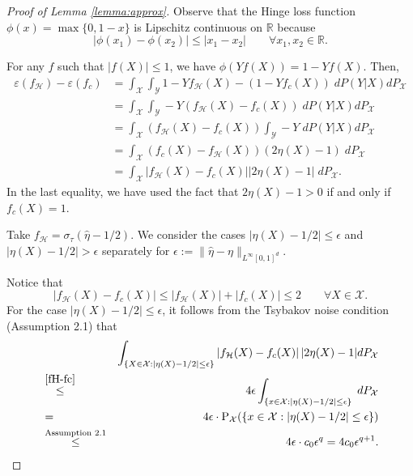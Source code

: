 \documentclass{article}
\def\RR{\mathbb R}
\begin{document}
\begin{proof}[Proof of Lemma \ref{lemma:approx}]
    Observe that the Hinge loss function $\phi(x) = \max \{0, 1-x\}$ is Lipschitz continuous on $\RR$ because 
\begin{equation} \label{Lip}
   |\phi(x_1)-\phi(x_2)| \leq |x_1-x_2| \qquad \forall x_1, x_2 \in \RR. 
\end{equation}

For any $f$ such that $|f(X)|\leq 1$, we have $\phi(Yf(X)) = 1-Yf(X)$.
Then,
\begin{align*}
  \varepsilon(f_\mathcal{H})- \varepsilon(f_c)  
  &= \int_\mathcal{X} \int_\mathcal{Y}   1-Yf_\mathcal{H}(X) - (1 - Yf_c(X)) \; dP(Y|X) d P_\mathcal{X}\\ 
  &= \int_\mathcal{X} \int_\mathcal{Y}  -Y(f_\mathcal{H}(X) - f_c(X)) \; dP(Y|X) d P_\mathcal{X}\\ 
  &=  \int_\mathcal{X}(f_\mathcal{H}(X) - f_c(X)) \int_\mathcal{Y}  -Y \; dP(Y|X)  d P_\mathcal{X}\\
  &=\int_\mathcal{X}(f_c(X)-f_\mathcal{H}(X) ) (2\eta(X)-1)\; d P_\mathcal{X}\\
  &= \int_\mathcal{X}  \left| f_\mathcal{H}(X) - f_c(X)\right|  |2\eta(X)-1|\;d P_\mathcal{X}.
\end{align*}
In the last equality, we have used the fact that $2\eta(X)-1>0$ if and only if $f_c(X)=1$. 

Take $f_\mathcal{H} = \sigma_\tau(\widehat{\eta}-1/2)$. We consider the cases $|\eta(X)-1/2| \leq \epsilon$ and $|\eta(X)-1/2| > \epsilon$ separately for $\epsilon :=\|\widehat{\eta}-\eta\|_{L^\infty[0,1]^d}$.

Notice that \begin{equation}\label{fH-fc}
    \left| f_\mathcal{H}(X) - f_c(X)\right| \leq |f_\mathcal{H}(X)|+ |f_c(X)| \leq 2 \qquad \forall X\in \mathcal{X}. 
\end{equation}
For the case $|\eta(X)-1/2| \leq \epsilon$, it follows from the Tsybakov noise condition (Assumption 2.1) that
\begin{eqnarray*}
 && \int_{\{X\in  \mathcal{X}:|\eta(X)-1/2| \leq \epsilon\} } \left| f_\mathcal{H}(X) - f_c(X)\right| |2\eta(X)-1| d P_\mathcal{X} \\
 &\stackrel{\eqref{fH-fc}}{\leq}& 4\epsilon \int_{\{x\in  \mathcal{X}: |\eta(X)-1/2| \leq \epsilon\} } \; d P_\mathcal{X}  \\
  &=&4\epsilon \cdot \mathrm{P}_{\mathcal{X}}(\{x\in  \mathcal{X} :|\eta(X)-1/2| \leq \epsilon\})\\
 &\stackrel{\text{Assumption 2.1}}{\leq}& 4\epsilon \cdot c_0\epsilon^q =  4c_0\epsilon^{q+1}.   
\end{eqnarray*}
 

\end{proof}
\end{document}
